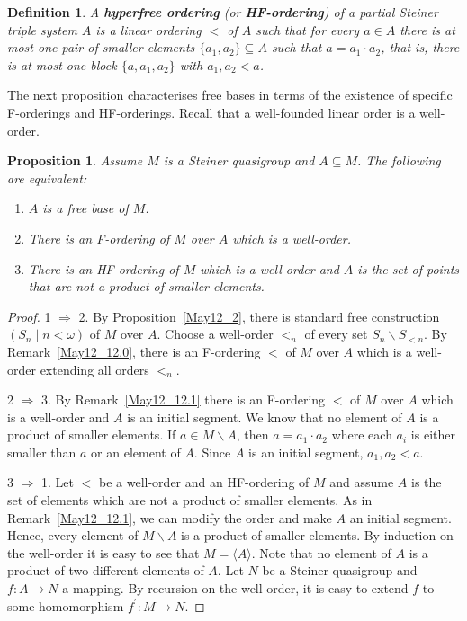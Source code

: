 \documentclass[10pt,a4paper]{article}
\theoremstyle{note}
\newtheorem{df}[thm]{Definition}
\newtheorem{prop}[thm]{Proposition}
\begin{document}
	\begin{df} A \textbf{hyperfree ordering}  (or \textbf{HF-ordering}) of a partial Steiner triple system $A$ is a linear ordering $<$ of $A$ such that for every $a\in A$ there is at most one pair of smaller elements $\{a_1,a_2\}\subseteq A$ such that $a=a_1\cdot a_2$, that is, there is at most one block $\{a,a_1,a_2\}$ with $a_1,a_2<a$.
	\end{df}
The next proposition characterises free bases in terms of the existence of specific F-orderings and HF-orderings. Recall that a well-founded linear order is a well-order.
	\begin{prop}\label{May12_2.2} Assume $M$ is a Steiner quasigroup and $A\subseteq M$. The following are equivalent:
		\begin{enumerate}
			\item $A$ is a free base of $M$.
			\item There is an F-ordering of $M$ over $A$ which is a well-order.
			\item There is an HF-ordering of $M$ which is a well-order and $A$ is the set of points that are not a product of smaller elements.
		\end{enumerate}
		\end{prop}
		\begin{proof}
			1 $\Rightarrow$ 2. By Proposition~\ref{May12_2}, there is standard free construction $(S_n\mid n<\omega)$ of $M$ over $A$. Choose a well-order $<_n$ of every set $S_n\smallsetminus S_{<n}$. By Remark~\ref{May12_12.0}, there is an F-ordering $<$ of $M$ over $A$ which is a well-order extending all orders $<_n$.
			
			2 $\Rightarrow$ 3. By Remark~\ref{May12_12.1} there is an F-ordering $<$ of $M$ over $A$ which is a well-order and $A$ is an initial segment. We know that no element of $A$ is a product of smaller elements. If $a\in M\smallsetminus A$, then $a= a_1\cdot a_2$ where each $a_i$ is either smaller than $a$ or an element of $A$. Since $A$ is an initial segment, $a_1,a_2 <a$.
			
			3 $\Rightarrow$ 1.  Let $<$ be a well-order and an HF-ordering of $M$ and assume $A$ is the set of elements which are not a product of smaller elements. As in Remark~\ref{May12_12.1}, we can modify the order and make $A$ an initial segment. Hence, every element of $M\smallsetminus A$ is a product of smaller elements. By induction on the well-order it is easy to see that $M=\langle A\rangle$. Note that no element of $A$ is a product of two different elements of $A$. Let $N$ be a Steiner quasigroup and $f:A\rightarrow N$ a  mapping. By recursion on the well-order, it is easy to extend $f$ to some homomorphism $f^\prime:M\rightarrow N$.
		\end{proof}
\end{document}
